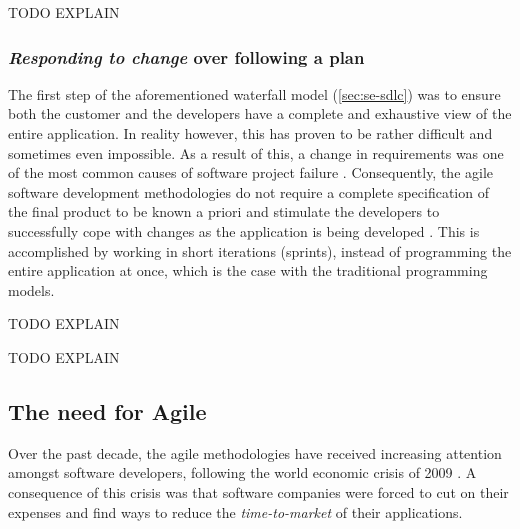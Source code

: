 TODO EXPLAIN

\subsubsection{\emph{Responding to change} over following a plan}
The first step of the aforementioned waterfall model (\autoref{sec:se-sdlc}) was to ensure both the customer and the developers have a complete and exhaustive view of the entire application. In reality however, this has proven to be rather difficult and sometimes even impossible. As a result of this, a change in requirements was one of the most common causes of software project failure \cite{glass2001agile}. Consequently, the agile software development methodologies do not require a complete specification of the final product to be known a priori and stimulate the developers to successfully cope with changes as the application is being developed \cite{Hazzan2014}. This is accomplished by working in short iterations (sprints), instead of programming the entire application at once, which is the case with the traditional programming models.

TODO EXPLAIN

TODO EXPLAIN

\subsection{The need for Agile}
Over the past decade, the agile methodologies have received increasing attention amongst software developers, following the world economic crisis of 2009 \cite{ionel2009}. A consequence of this crisis was that software companies were forced to cut on their expenses and find ways to reduce the \emph{time-to-market} of their applications.



